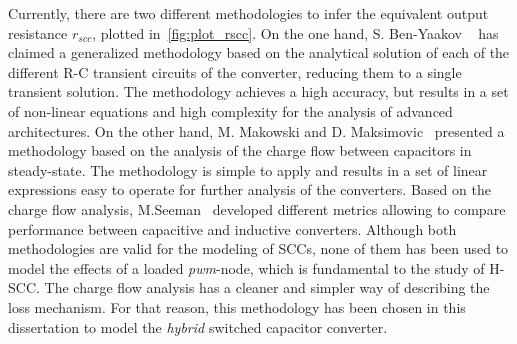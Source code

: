 Currently, there are two different methodologies to infer the equivalent output resistance $r_{scc}$, plotted in~\ref{fig:plot_rscc}. On the one hand, S. Ben-Yaakov  ~\cite{2009Ben-Yaakov,2012Ben-Yaakov,2013Evzelman} has claimed a generalized methodology based on the analytical solution of each of the different R-C transient circuits of the converter, reducing them to a single transient solution. The methodology achieves a high accuracy, but results in a set of non-linear equations and high complexity for the analysis of advanced architectures.
On the other hand,  M. Makowski and D. Maksimovic~\cite{95Makowski} presented a methodology based on the analysis of the charge flow between capacitors in steady-state. The methodology is simple to apply and results in a set of linear expressions easy to operate for further analysis of the converters. Based on the charge flow analysis, M.Seeman~\cite{Seeman:EECS-2009-78} developed different metrics allowing to compare performance between capacitive and inductive converters.
Although both methodologies are valid for the modeling of SCCs, none of them has been used to model the effects of a loaded \emph{pwm}-node, which is fundamental to the study of H-SCC.  The charge flow analysis has a cleaner and simpler way of describing the loss mechanism. For that reason, this methodology has been chosen in this dissertation to model the \emph{hybrid} switched capacitor converter.

